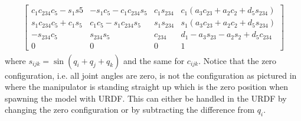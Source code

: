 \begin{subequations}
\begin{align}
\begin{split}
            \begin{bmatrix}\label{eq:T5}
                c_1c_{234}c_5 - s_1s5 & -s_1c_5 - c_1c_{234}s_5 & c_1s_{234} & c_1(a_3c_{23} + a_2c_2 + d_5s_{234})\\
                s_1c_{234}c_5 + c_1s_5 & c_1c_5 - s_1c_{234}s_5 & s_1s_{234} & s_1(a_3c_{23} + a_2c_2 + d_5s_{234})\\
                -s_{234}c_5 & s_{234}s_5 & c_{234} & d_1 - a_3s_{23} - a_2s_2 + d_5c_{234}\\
                0 & 0 & 0 & 1
            \end{bmatrix}
        \end{split}
     \end{align}
\end{subequations}
where $s_{ijk} = \sin{(q_i + q_j + q_k)}$ and the same for $c_{ijk}$. Notice that the zero configuration, i.e. all joint angles are zero, is not the configuration as pictured in  where the manipulator is standing straight up which is the zero position when spawning the model with URDF. This can either be handled in the URDF by changing the zero configuration or by subtracting the difference from $q_i$.

